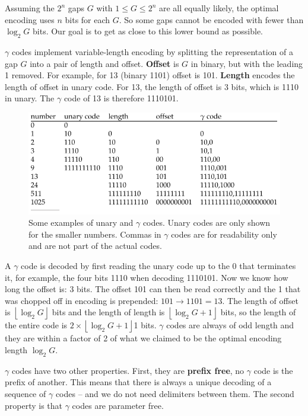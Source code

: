 \documentclass[letterpaper,11pt]{article}
\begin{document}
Assuming the $2^n$ gaps $G$ with $1 \leq G \leq 2^n$ are all equally likely, the optimal encoding uses $n$ bits for each $G$. So some gaps cannot be encoded with fewer than $\log_2 G$ bits. Our goal is to get as close to this lower bound as possible.

$\gamma$ codes implement variable-length encoding by splitting the representation of a gap $G$ into a pair of length and offset. \textbf{Offset} is $G$ in binary, but with the leading 1 removed. For example, for 13 (binary 1101) offset is 101. \textbf{Length} encodes the length of offset in unary code. For 13, the length of offset is 3 bits, which is 1110 in unary. The $\gamma$ code of 13 is therefore 1110101.
\begin{figure}[H]
    \centering
    \includegraphics[scale=0.60]{sect5/table_5_5.png}
    \caption{Some examples of unary and $\gamma$ codes. Unary codes are only shown for the smaller numbers. Commas in $\gamma$ codes are for readability only and are not part of the actual codes.}
\end{figure}

A $\gamma$ code is decoded by first reading the unary code up to the 0 that terminates it, for example, the four bits 1110 when decoding 1110101. Now we know how long the offset is: 3 bits. The offset 101 can then be read correctly and the 1 that was chopped off in encoding is prepended: $101 \rightarrow 1101 = 13$. The length of offset is $\left \lfloor{\log_2 G}\right \rfloor$ bits and the length of length is $\left \lfloor{\log_2 G + 1}\right \rfloor$ bits, so the length of the entire code is $2 \times \left \lfloor{\log_2 G + 1}\right \rfloor$1 bits. $\gamma$ codes are always of odd length and they are within a factor of 2 of what we claimed to be the optimal encoding length $\log_2 G$.

$\gamma$ codes have two other properties. First, they are \textbf{prefix free}, no $\gamma$ code is the prefix of another. This means that there is always a unique decoding of a sequence of $\gamma$ codes – and we do not need delimiters between them. The second property is that $\gamma$ codes are parameter free.
\end{document}
